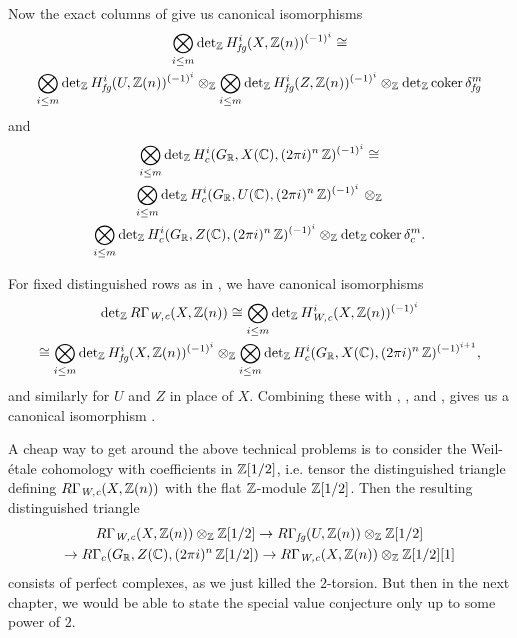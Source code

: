 \begin{nameless}
  Now the exact columns of  give us
  canonical isomorphisms
  \begin{multline}
    \label{eqn:det-RGammafg-truncated}
    \bigotimes_{i\le m} \det\nolimits_{\mathbb{Z}} H^i_\text{\it fg} (X, \mathbb{Z} (n))^{(-1)^i} \cong\\
    \bigotimes_{i\le m} \det\nolimits_{\mathbb{Z}} H^i_\text{\it fg} (U, \mathbb{Z} (n))^{(-1)^i}
    \otimes_{\mathbb{Z}}
    \bigotimes_{i\le m} \det\nolimits_{\mathbb{Z}} H^i_\text{\it fg} (Z, \mathbb{Z} (n))^{(-1)^i}
    \otimes_{\mathbb{Z}} \det\nolimits_{\mathbb{Z}} \operatorname{coker} \delta_\text{\it fg}^m
  \end{multline}
  and
  \begin{multline}
    \label{eqn:det-RGammac-truncated}
    \bigotimes_{i\le m} \det\nolimits_{\mathbb{Z}} H^i_c (G_{\mathbb{R}}, X (\mathbb{C}), (2\pi i)^n\,\mathbb{Z})^{(-1)^i} \cong \\
    \bigotimes_{i\le m} \det\nolimits_{\mathbb{Z}} H^i_c (G_{\mathbb{R}}, U (\mathbb{C}), (2\pi i)^n\,\mathbb{Z})^{(-1)^i} ~ \otimes_{\mathbb{Z}} \\
    \bigotimes_{i\le m} \det\nolimits_{\mathbb{Z}} H^i_c (G_{\mathbb{R}}, Z (\mathbb{C}), (2\pi i)^n\,\mathbb{Z})^{(-1)^i} \otimes_{\mathbb{Z}}
    \det\nolimits_{\mathbb{Z}} \operatorname{coker} \delta_c^m.
  \end{multline}

  For fixed distinguished rows as in
  , we have canonical isomorphisms
  \begin{multline*}
    \det\nolimits_{\mathbb{Z}} R\Gamma_\text{\it W,c} (X,\mathbb{Z} (n)) \cong \bigotimes_{i\le m} \det\nolimits_{\mathbb{Z}} H^i_\text{\it W,c} (X, \mathbb{Z} (n))^{(-1)^i} \\
    \cong \bigotimes_{i\le m} \det\nolimits_{\mathbb{Z}} H^i_\text{\it fg} (X, \mathbb{Z} (n))^{(-1)^i} \otimes_{\mathbb{Z}}
    \bigotimes_{i\le m} \det\nolimits_{\mathbb{Z}} H^i_c (G_{\mathbb{R}}, X (\mathbb{C}), (2\pi i)^n\,\mathbb{Z})^{(-1)^{i+1}},
  \end{multline*}
  and similarly for $U$ and $Z$ in place of $X$. Combining these with
  , ,
  and , gives us a
  canonical isomorphism
  .
\end{nameless}

\begin{remark}
  A cheap way to get around the above technical problems is to consider the
  Weil-étale cohomology with coefficients in $\mathbb{Z} [1/2]$, i.e. tensor the
  distinguished triangle defining $R\Gamma_\text{\it W,c} (X, \mathbb{Z} (n))$ with the
  flat $\mathbb{Z}$-module $\mathbb{Z} [1/2]$. Then the resulting distinguished triangle
  \begin{multline*}
    R\Gamma_\text{\it W,c} (X, \mathbb{Z} (n)) \otimes_{\mathbb{Z}} \mathbb{Z} [1/2] \to
    R\Gamma_\text{\it fg} (U, \mathbb{Z} (n)) \otimes_{\mathbb{Z}} \mathbb{Z} [1/2] \\
    \to R\Gamma_c (G_{\mathbb{R}}, Z (\mathbb{C}), (2\pi i)^n\,\mathbb{Z} [1/2]) \to
    R\Gamma_\text{\it W,c} (X, \mathbb{Z} (n)) \otimes_{\mathbb{Z}} \mathbb{Z} [1/2] [1]
  \end{multline*}
  consists of perfect complexes, as we just killed the $2$-torsion. But then in
  the next chapter, we would be able to state the special value conjecture only
  up to some power of $2$.
\end{remark}

